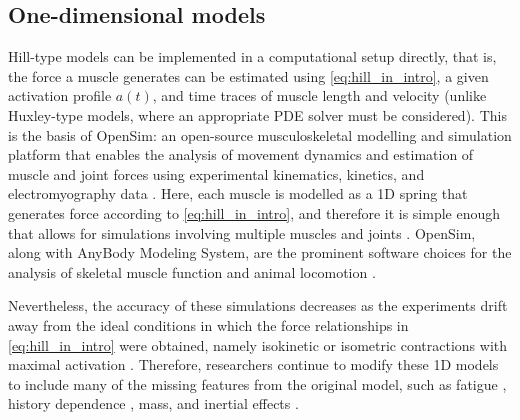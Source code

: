 \documentclass{sfuthesis}
\numberwithin{equation}{section}
\numberwithin{figure}{chapter}
\numberwithin{table}{chapter}
\theoremstyle{definition}
\begin{document}
\subsection{One-dimensional models}

Hill-type models can be implemented in a computational setup directly, that is, the force a muscle generates can be estimated using \eqref{eq:hill_in_intro}, a given activation profile $a(t)$, and time traces of muscle length and velocity (unlike Huxley-type models, where an appropriate PDE solver must be considered). This is the basis of OpenSim:
an open-source musculoskeletal modelling and simulation platform that enables the analysis of movement dynamics and estimation of muscle and joint forces using experimental kinematics, kinetics, and electromyography data \cite{Delp2007OpenSim}. Here, each muscle is modelled as a 1D spring that generates force according to \eqref{eq:hill_in_intro}, and therefore it is simple enough that allows for simulations involving multiple muscles and joints \cite{BishopEtAl2021Dinosaurs, Porsa2016DirectMethodsOpenSim, RajagopalEtAl2016FullBody, StarkEtAl2021Dogs}. OpenSim, along with AnyBody Modeling System\texttrademark, are the prominent software choices for the analysis of skeletal muscle function and animal locomotion \cite{Gautam2024AnybodyOpensim}.

Nevertheless, the accuracy of these simulations decreases as the experiments drift away from the ideal conditions in which the force relationships in \eqref{eq:hill_in_intro} were obtained, namely isokinetic or isometric contractions with maximal activation \cite{Dick2017, Lee2013AccuracyofGastrocForces, MillardEtAl2013, Perreault2003HillErrors}.  Therefore, researchers continue to modify these 1D models to include many of the missing features from the original model, such as fatigue \cite{Pereira2011Fatigue1D}, history dependence \cite{McGowanEtAl2013,Ross2018}, mass, and inertial effects \cite{Gunther2012,Ross2018,RossWakeling2016Multibody,Paper4_RossWakeling2021}.
\end{document}
